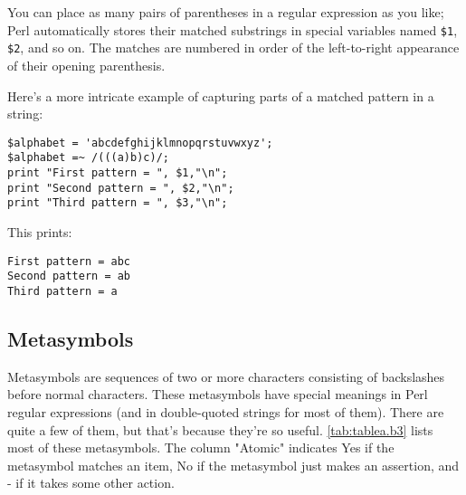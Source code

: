 You can place as many pairs of parentheses in a regular expression as you like; Perl automatically stores their matched substrings in special variables named \verb|$1|, \verb|$2|, and so on. The matches are numbered in order of the left-to-right appearance of their opening parenthesis.

Here's a more intricate example of capturing parts of a matched pattern in a string:

\begin{lstlisting}
$alphabet = 'abcdefghijklmnopqrstuvwxyz';
$alphabet =~ /(((a)b)c)/;
print "First pattern = ", $1,"\n";
print "Second pattern = ", $2,"\n";
print "Third pattern = ", $3,"\n";
\end{lstlisting}

This prints:

\begin{lstlisting}
First pattern = abc
Second pattern = ab
Third pattern = a
\end{lstlisting}

\subsection{Metasymbols}
Metasymbols are sequences of two or more characters consisting of backslashes before normal characters. These metasymbols have special meanings in Perl regular expressions (and in double-quoted strings for most of them). There are quite a few of them, but that's because they're so useful. \autoref{tab:tablea.b3} lists most of these metasymbols. The column "Atomic" indicates Yes if the metasymbol matches an item, No if the metasymbol just makes an assertion, and - if it takes some other action.

